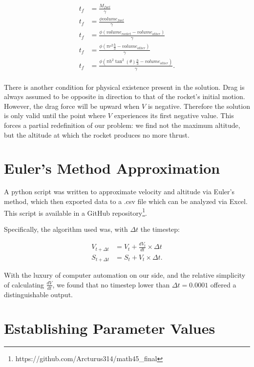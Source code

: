 \documentclass[]{article}
\begin{document}
\begin{center}
	\begin{align*}
	t_f &= \frac{M_{fuel}}{\gamma} \\
	t_f &= \frac{\phi volume_{fuel}}{\gamma} \\
	t_f &= \frac{\phi (volume_{rocket} - volume_{other}) } {\gamma} \\
	t_f &= \frac{\phi (\pi r^2 \frac{h}{3} - volume_{other}) } {\gamma} \\
	t_f &= \frac{\phi (\pi h^2 \tan^2(\theta) \frac{h}{3} - volume_{other}) } {\gamma} . \\
	\end{align*}
\end{center}

There is another condition for physical existence present in the solution. Drag is always assumed to be opposite in direction to that of the rocket's initial motion. However, the drag force will be upward when $V$ is negative. Therefore the solution is only valid until the point where $V$ experiences its first negative value. This forces a partial redefinition of our problem: we find not the maximum altitude, but the altitude at which the rocket produces no more thrust.

\section{Euler's Method Approximation}

A python script was written to approximate velocity and altitude via Euler's method, which then exported data to a .csv file which can be analyzed via Excel. This script is available in a GitHub repository\footnote{https://github.com/Arcturus314/math45\_final}.


 Specifically, the algorithm used was, with $\Delta t$ the timestep:

\begin{center}
	\begin{align*}
	V_{t+\Delta t} &= V_{t} + \frac{dV_{t}}{dt}\times \Delta t \\
	S_{t+\Delta t} &= S_{t} + V_{t}\times \Delta t .
	\end{align*}
\end{center}

With the luxury of computer automation on our side, and the relative simplicity of calculating $\frac{dV}{dt}$, we found that no timestep lower than $\Delta t = 0.0001$ offered a distinguishable output.

\section{Establishing Parameter Values}
\end{document}
